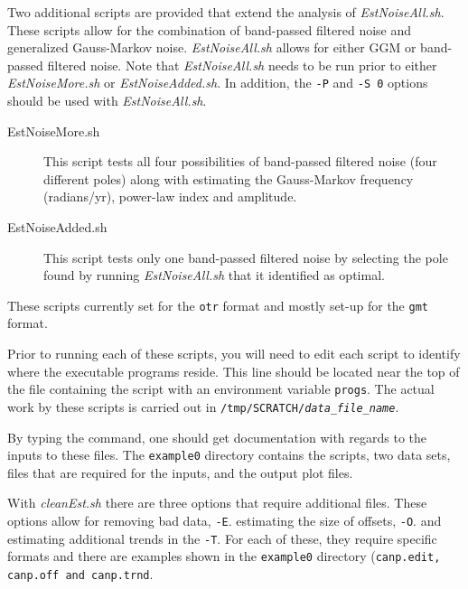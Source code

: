 \documentclass[12pt]{amsart}
\begin{document}
Two additional scripts are provided that extend the analysis of \textit{EstNoiseAll.sh}.  These scripts allow for the combination of band-passed
filtered noise and generalized Gauss-Markov noise. \textit{EstNoiseAll.sh} allows for either GGM or band-passed filtered noise. Note that \textit{EstNoiseAll.sh} 
needs to be run prior to either \textit{EstNoiseMore.sh} or \textit{EstNoiseAdded.sh}. In addition, the \texttt{-P} and \texttt{-S 0} options should be used with  \textit{EstNoiseAll.sh}.
\begin{description}
\item[EstNoiseMore.sh]  This script tests all four possibilities of band-passed filtered noise (four different poles) along with estimating the Gauss-Markov frequency (radians/yr), power-law index and amplitude.
\item[EstNoiseAdded.sh] This script tests only one band-passed filtered noise by selecting the pole found by running \textit{EstNoiseAll.sh} that
it identified as optimal.
\end{description}
These scripts currently set for the \texttt{otr} format and mostly set-up for
the \texttt{gmt} format. 

Prior to running each of these scripts, you will need to edit each script to identify where the executable programs reside.
This line should be located near the top of the file containing the script with an environment variable \texttt{progs}.  The actual
work by these scripts is carried out in \texttt{/tmp/SCRATCH/\textit{data\_file\_name}}.

By typing the command, one should get documentation with regards to the inputs to these files. The \texttt{example0} directory
contains the scripts, two data sets, files that are required for the inputs, and the output plot files.

With \textit{cleanEst.sh} there are three options that require additional files.  These options allow for removing bad data, \texttt{-E}.
estimating the size of offsets, \texttt{-O}. and estimating additional trends in the  \texttt{-T}.  For each of these, they require specific formats
and there are examples shown in the \texttt{example0} directory (\texttt{canp.edit, canp.off and canp.trnd}.
\end{document}
